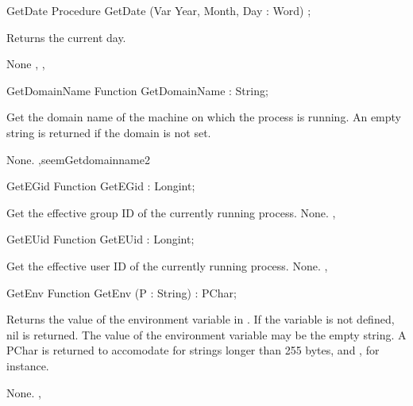 \latex{}
\html{}
\begin{procedure}{GetDate}
\Declaration
Procedure GetDate  (Var Year, Month, Day : Word) ;

\Description

Returns the current day.

\Errors
None
\SeeAlso
{}, ,  
\end{procedure}
\latex{}
\html{}
\begin{function}{GetDomainName}
\Declaration
Function GetDomainName  : String;

\Description

Get the domain name of the machine on which the process is running.
An empty string is returned if the domain is not set.

\Errors
None.
\SeeAlso
 ,seem{Getdomainname}{2} 
\end{function}
\latex{}
\html{}
\begin{function}{GetEGid}
\Declaration
Function GetEGid  : Longint;

\Description
 Get the effective group ID of the currently running process.
\Errors
None.
\SeeAlso
{},  
\end{function}
\latex{}
\html{}
\begin{function}{GetEUid}
\Declaration
Function GetEUid  : Longint;

\Description
 Get the effective user ID of the currently running process.
\Errors
None.
\SeeAlso
{},  
\end{function}
\latex{}
\html{}
\begin{function}{GetEnv}
\Declaration
Function GetEnv (P : String) : PChar;

\Description
Returns the value of the environment variable in . If the variable is
not defined, nil is returned. The value of the environment variable may be
the empty string.
A PChar is returned to accomodate for strings longer than 255 bytes,
 and , for instance.

\Errors
None.
\SeeAlso
{},  
\end{function}
\latex{}
